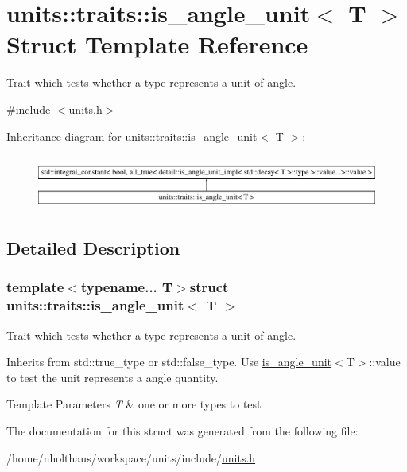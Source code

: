 \hypertarget{structunits_1_1traits_1_1is__angle__unit}{}\section{units\+:\+:traits\+:\+:is\+\_\+angle\+\_\+unit$<$ T $>$ Struct Template Reference}
\label{structunits_1_1traits_1_1is__angle__unit}


Trait which tests whether a type represents a unit of angle.  




{\ttfamily \#include $<$units.\+h$>$}

Inheritance diagram for units\+:\+:traits\+:\+:is\+\_\+angle\+\_\+unit$<$ T $>$\+:\begin{figure}[H]
\begin{center}
\leavevmode
\includegraphics[height=1.797753cm]{structunits_1_1traits_1_1is__angle__unit}
\end{center}
\end{figure}


\subsection{Detailed Description}
\subsubsection*{template$<$typename... T$>$struct units\+::traits\+::is\+\_\+angle\+\_\+unit$<$ T $>$}

Trait which tests whether a type represents a unit of angle. 

Inherits from {\ttfamily std\+::true\+\_\+type} or {\ttfamily std\+::false\+\_\+type}. Use {\ttfamily \hyperlink{structunits_1_1traits_1_1is__angle__unit}{is\+\_\+angle\+\_\+unit}$<$T$>$\+::value} to test the unit represents a angle quantity. 
\begin{DoxyTemplParams}{Template Parameters}
{\em T} & one or more types to test \\
\hline
\end{DoxyTemplParams}


The documentation for this struct was generated from the following file\+:\begin{DoxyCompactItemize}
\item 
/home/nholthaus/workspace/units/include/\hyperlink{units_8h}{units.\+h}\end{DoxyCompactItemize}
